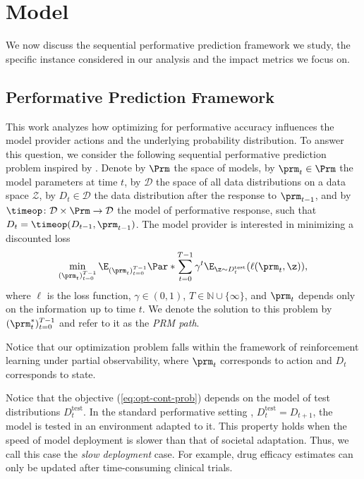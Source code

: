 \section{Model}

We now discuss the sequential performative prediction framework we study, the specific
instance considered in our analysis and the impact metrics we focus on.

\subsection{Performative Prediction Framework}
\label{subsec:perf_pred_framework}

 This work analyzes how optimizing for performative accuracy influences the model provider actions and
the underlying probability distribution. To answer this question, we consider
the following sequential performative prediction problem inspired by
\citet{p20p,b22p,r22d}. Denote by $\Prm$ the space of models, by $\prm_t \in
\Prm$ the model parameters at time $t$, by $\mathcal{D}$ the space of all data
distributions on a data space $\mathcal{Z}$, by $D_t \in \mathcal{D}$ the data
distribution after the response to $\prm_{t-1}$, and by $\timeop\colon
\mathcal{D} \times \Prm \to \mathcal{D}$ the model of performative response,
such that $D_t = \timeop(D_{t-1}, \prm_{t-1})$. The model provider is
interested in minimizing a discounted loss
\begin{equation}
    \label{eq:opt-cont-prob}
    \min_{(\prm_t)_{t=0}^{T-1}} \E_{(\prm_t)_{t=0}^{T-1}}\Par*{\sum_{t=0}^{T-1}
    \gamma^t \E_{\z \sim D_t^\text{test}} (\ell(\prm_t, \z))},
\end{equation}
where $\ell$ is the loss function, $\gamma \in (0, 1)$, $T \in \mathbb{N} \cup
\{\infty\}$, and $\prm_t$ depends only on the information up to time $t$.
We denote the solution to this problem by
$(\prm^*_t)_{t=0}^{T-1}$ and refer to it as the \emph{PRM path}.

\begin{remark}
    Notice that our optimization problem falls within the framework of
    reinforcement learning under partial observability, where $\prm_t$
    corresponds to action and $D_t$ corresponds to state.
\end{remark}

 Notice that the objective (\ref{eq:opt-cont-prob}) depends on the model of test
distributions $D_t^\text{test}$. In the standard performative setting \citep{p20p},
$D_t^\text{test} = D_{t+1}$, the model is tested in an environment adapted to
it. This property holds when the speed of model deployment is slower than that
of societal adaptation. Thus, we call this case the \emph{slow deployment}
case. For example, drug efficacy estimates can only be updated after
time-consuming clinical trials.

